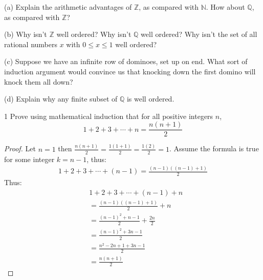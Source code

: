 \begin{problem}[Warmup]{(a)}
    Explain the arithmetic advantages of $\mathbb{Z}$, as compared with $\mathbb{N}$. How about $\mathbb{Q}$, as compared with $\mathbb{Z}$?
\end{problem}
\unsolved

\begin{problem}[Warmup]{(b)}
    Why isn't $\mathbb{Z}$ well ordered? Why isn't $\mathbb{Q}$ well ordered? Why isn't the set of all rational numbers $x$ with $0 \le x \le 1$ well ordered?
\end{problem}
\unsolved

\begin{problem}[Warmup]{(c)}
    Suppose we have an infinite row of dominoes, set up on end. What sort of induction argument would convince us that knocking down the first domino will knock them all down?
\end{problem}
\unsolved

\begin{problem}[Warmup]{(d)}
    Explain why any finite subset of $\mathbb{Q}$ is well ordered.
\end{problem}
\unsolved

\begin{problem}{1}
    Prove using mathematical induction that for all positive integers $n$,
    \[1 + 2 + 3 + \cdots + n = \frac{n(n + 1)}{2}\]
\end{problem}
\solved

\begin{proof}
    Let $n = 1$ then $\frac{n(n + 1)}{2} = \frac{1(1 + 1)}{2} = \frac{1(2)}{2} = 1$.
    Assume the formula is true for some integer $k = n - 1$, thus:
    \begin{align*}
        1 + 2 + 3 + \cdots + (n - 1) = \frac{(n - 1)((n - 1) + 1)}{2}
    \end{align*}
    Thus:
    \begin{align*}
         & 1 + 2 + 3 + \cdots + (n - 1) + n               \\
         & = \frac{(n - 1)((n - 1) + 1)}{2} + n           \\
         & = \frac{{(n - 1)}^2 + n - 1}{2} + \frac{2n}{2} \\
         & = \frac{{(n - 1)}^2 + 3n - 1}{2}               \\
         & = \frac{n^2 - 2n + 1 + 3n - 1}{2}              \\
         & = \frac{n(n + 1)}{2}
    \end{align*}
\end{proof}

